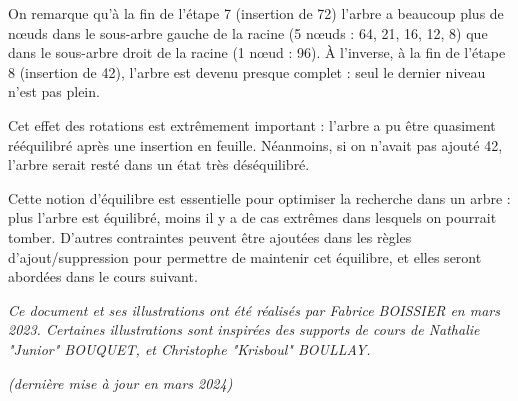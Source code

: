\documentclass[11pt,a4paper]{article}
\begin{document}
\bigskip

On remarque qu'à la fin de l'étape 7 (insertion de 72) l'arbre a beaucoup plus de nœuds dans le sous-arbre gauche de la racine (5 nœuds : 64, 21, 16, 12, 8) que dans le sous-arbre droit de la racine (1 nœud : 96).
À l'inverse, à la fin de l'étape 8 (insertion de 42), l'arbre est devenu presque complet : seul le dernier niveau n'est pas plein.

\smallskip

Cet effet des rotations est extrêmement important : l'arbre a pu être quasiment rééquilibré après une insertion en feuille.
Néanmoins, si on n'avait pas ajouté 42, l'arbre serait resté dans un état très déséquilibré.

\medskip

Cette notion d'équilibre est essentielle pour optimiser la recherche dans un arbre : plus l'arbre est équilibré, moins il y a de cas extrêmes dans lesquels on pourrait tomber.
D'autres contraintes peuvent être ajoutées dans les règles d'ajout/suppression pour permettre de maintenir cet équilibre, et elles seront abordées dans le cours suivant.



\bigskip

\vfill


\begin{center}
\textit{Ce document et ses illustrations ont été réalisés par Fabrice BOISSIER en mars 2023.
Certaines illustrations sont inspirées des supports de cours de Nathalie "Junior" BOUQUET, et Christophe "Krisboul" BOULLAY.}

\textit{(dernière mise à jour en mars 2024)}
\end{center}
\end{document}

